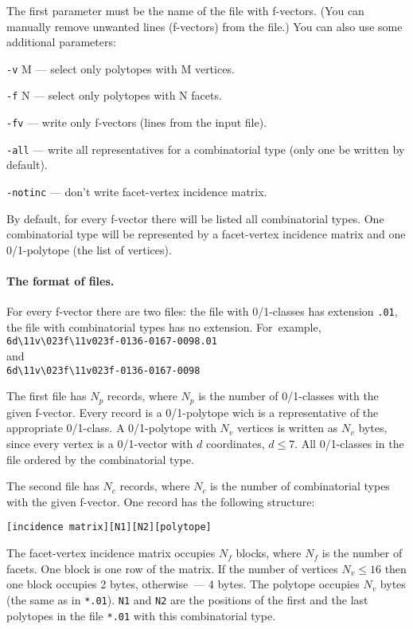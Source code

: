 \documentclass[12pt]{article}
\begin{document}
The first parameter must be the name of the file with f-vectors. (You can manually remove unwanted lines (f-vectors) from the file.)
You can also use some additional parameters:

\texttt{-v} M --- select only polytopes with M vertices.

\texttt{-f} N --- select only polytopes with N facets.

\texttt{-fv} ---    write only f-vectors (lines from the input file).

\texttt{-all} ---   write all representatives for a combinatorial type (only one be written by default).

\texttt{-notinc} ---   don't write facet-vertex incidence matrix.

By default, for every f-vector there will be listed all combinatorial types. One combinatorial type will be represented by a facet-vertex incidence matrix and one 0/1-polytope (the list of vertices).

\paragraph{The format of files.}
For every f-vector there are two files: the file with 0/1-classes has extension \texttt{.01}, the file with combinatorial types has no extension. For~example,\\
\texttt{6d\textbackslash11v\textbackslash023f\textbackslash11v023f-0136-0167-0098.01}\\
and\\
\texttt{6d\textbackslash11v\textbackslash023f\textbackslash11v023f-0136-0167-0098}

The first file has $N_p$ records, where $N_p$ is the number of 0/1-classes with the given f-vector.
Every record is a 0/1-polytope wich is a representative of the appropriate 0/1-class.
A 0/1-polytope with $N_v$ vertices is written as $N_v$ bytes,
since every vertex is a 0/1-vector with $d$ coordinates, $d \le 7$.
All 0/1-classes in the file ordered by the combinatorial type.

The second file has $N_c$ records, where $N_c$ is the number of combinatorial types with the given f-vector.
One record has the following structure:\\
\centerline{\texttt{[incidence matrix][N1][N2][polytope]}}
The facet-vertex incidence matrix occupies $N_f$ blocks, where $N_f$ is the number of facets.
One block is one row of the matrix. If the number of vertices $N_v \le 16$ then one block occupies 2 bytes, otherwise~--- 4 bytes.
The polytope occupies $N_v$ bytes (the same as in \texttt{*.01}).
\texttt{N1} and \texttt{N2} are the positions of the first and the last polytopes in the file \texttt{*.01} with this combinatorial type. 
\end{document}
